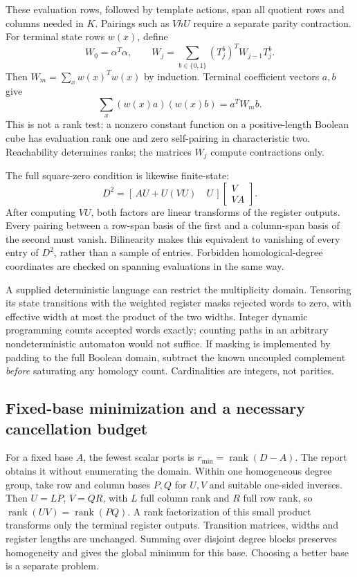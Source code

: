 These evaluation rows, followed by template actions, span all quotient rows
and columns needed in $K$. Pairings such as $VhU$ require a separate parity
contraction. For terminal state rows $w(x)$, define
\[
 W_0=\alpha^T\alpha,\qquad
 W_j=\sum_{b\in\{0,1\}}(T_j^b)^TW_{j-1}T_j^b.
\]
Then $W_m=\sum_xw(x)^Tw(x)$ by induction. Terminal coefficient vectors
$a,b$ give
\[
 \sum_x(w(x)a)(w(x)b)=a^TW_mb.
\]
This is not a rank test: a
nonzero constant function on a positive-length Boolean cube has evaluation
rank one and zero self-pairing in characteristic two. Reachability determines
ranks; the matrices $W_j$ compute contractions only.

The full square-zero condition is likewise finite-state:
\[
 D^2=[\,AU+U(VU)\quad U\,]
       \begin{bmatrix}V\\VA\end{bmatrix}.
\]
After computing $VU$, both factors are linear transforms of the register
outputs. Every pairing between a row-span basis of the first and a
column-span basis of the second must vanish. Bilinearity makes this equivalent
to vanishing of every entry of $D^2$, rather than a sample of entries.
Forbidden homological-degree coordinates are checked on spanning evaluations
in the same way.

A supplied deterministic language can restrict the multiplicity domain.
Tensoring its state transitions with the weighted register masks rejected
words to zero, with effective width at most the product of the two widths.
Integer dynamic programming counts accepted words exactly; counting paths
in an arbitrary nondeterministic automaton would not suffice. If masking is
implemented by padding to the full Boolean domain, subtract the known
uncoupled complement \emph{before} saturating any homology count. Cardinalities
are integers, not parities.

\subsection{Fixed-base minimization and a necessary cancellation budget}
For a fixed base $A$, the fewest scalar ports is
$r_{\min}=\operatorname{rank}(D-A)$. The report obtains it without enumerating
the domain. Within one homogeneous degree group, take row and column bases
$P,Q$ for $U,V$ and suitable one-sided inverses. Then $U=LP$, $V=QR$, with
$L$ full column rank and $R$ full row rank, so
$\operatorname{rank}(UV)=\operatorname{rank}(PQ)$. A rank factorization of
this small product transforms only the terminal register outputs. Transition
matrices, widths and register lengths are unchanged. Summing over disjoint
degree blocks preserves homogeneity and gives the global minimum for this
base. Choosing a better base is a separate problem.

